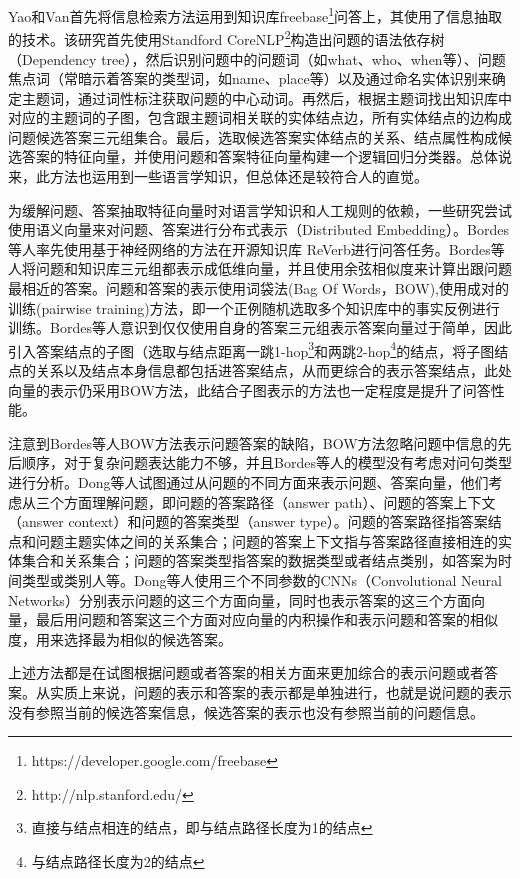 Yao和Van\cite{Yao}首先将信息检索方法运用到知识库freebase\footnote{https://developer.google.com/freebase}问答上，其使用了信息抽取的技术。该研究首先使用Standford CoreNLP\footnote{http://nlp.stanford.edu/}构造出问题的语法依存树（Dependency tree），然后识别问题中的问题词（如what、who、when等）、问题焦点词（常暗示着答案的类型词，如name、place等）以及通过命名实体识别来确定主题词，通过词性标注获取问题的中心动词。再然后，根据主题词找出知识库中对应的主题词的子图，包含跟主题词相关联的实体结点边，所有实体结点的边构成问题候选答案三元组集合。最后，选取候选答案实体结点的关系、结点属性构成候选答案的特征向量，并使用问题和答案特征向量构建一个逻辑回归分类器。总体说来，此方法也运用到一些语言学知识，但总体还是较符合人的直觉。

为缓解问题、答案抽取特征向量时对语言学知识和人工规则的依赖，一些研究尝试使用语义向量来对问题、答案进行分布式表示（Distributed Embedding）。Bordes\cite{Bordes3}等人率先使用基于神经网络的方法在开源知识库 ReVerb\cite{Fader}进行问答任务。Bordes等人将问题和知识库三元组都表示成低维向量，并且使用余弦相似度来计算出跟问题最相近的答案。问题和答案的表示使用词袋法(Bag Of Words，BOW),使用成对的训练(pairwise training)方法，即一个正例随机选取多个知识库中的事实反例进行训练。Bordes\cite{Bordes1}等人意识到仅仅使用自身的答案三元组表示答案向量过于简单，因此引入答案结点的子图（选取与结点距离一跳1-hop\footnote{直接与结点相连的结点，即与结点路径长度为1的结点}和两跳2-hop\footnote{与结点路径长度为2的结点}的结点，将子图结点的关系以及结点本身信息都包括进答案结点，从而更综合的表示答案结点，此处向量的表示仍采用BOW方法，此结合子图表示的方法也一定程度是提升了问答性能。

注意到Bordes等人BOW方法表示问题答案的缺陷，BOW方法忽略问题中信息的先后顺序，对于复杂问题表达能力不够，并且Bordes等人的模型没有考虑对问句类型进行分析。Dong\cite{Dong}等人试图通过从问题的不同方面来表示问题、答案向量，他们考虑从三个方面理解问题，即问题的答案路径（answer path）、问题的答案上下文（answer context）和问题的答案类型（answer type）。问题的答案路径指答案结点和问题主题实体之间的关系集合；问题的答案上下文指与答案路径直接相连的实体集合和关系集合；问题的答案类型指答案的数据类型或者结点类别，如答案为时间类型或类别人等。Dong等人使用三个不同参数的CNNs（Convolutional Neural Networks）分别表示问题的这三个方面向量，同时也表示答案的这三个方面向量，最后用问题和答案这三个方面对应向量的内积操作和表示问题和答案的相似度，用来选择最为相似的候选答案。

上述方法都是在试图根据问题或者答案的相关方面来更加综合的表示问题或者答案。从实质上来说，问题的表示和答案的表示都是单独进行，也就是说问题的表示没有参照当前的候选答案信息，候选答案的表示也没有参照当前的问题信息。

